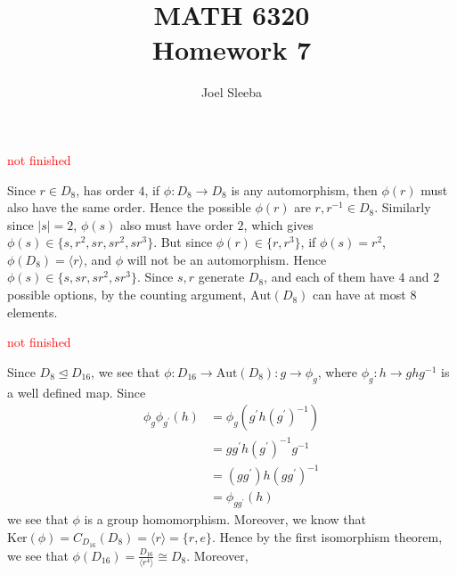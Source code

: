 \documentclass[12pt]{exam}
\theoremstyle{plain} %
\theoremstyle{definition} %
\theoremstyle{remark} %
\begin{document}
\title{MATH 6320 \\ Homework 7}

\author{
  Joel Sleeba \\
}

\maketitle
\printanswers
\unframedsolutions

\begin{questions}

  \question
  \textcolor{red}{not finished}

  \begin{solution}

  \end{solution}

  \question
  \begin{solution}
    Since $r \in D_8$, has order $4$, if $\phi: D_8 \to D_8$ is any
    automorphism, then $\phi(r)$ must also have the same order. Hence
    the possible $\phi(r)$ are $r, r^{-1} \in D_8$. Similarly  since
    $|s| = 2$, $\phi(s)$ also  must have order $2$, which gives
    $\phi(s) \in \{ s, r^2, sr, sr^2, sr^3\}$. But since $\phi(r) \in
    \{ r , r^3  \}$, if $\phi(s) = r^2$, $\phi(D_8) = \langle  r
    \rangle $, and $\phi$ will not be an automorphism. Hence $\phi(s)
    \in \{  s, sr, sr^2, sr^3 \}$. Since $s, r$ generate $D_8$, and
    each of them have $4$ and $2$ possible options, by the counting
    argument, $\textrm{Aut}(D_8)$ can have at most 8 elements.
  \end{solution}

  \question
  \textcolor{red}{not finished}
  \begin{solution}
    Since $D_8 \trianglelefteq D_{16}$, we see that $\phi: D_{16} \to
    \textrm{Aut}(D_8): g \to \phi_g$, where $\phi_g: h \to ghg^{-1}$
    is a well defined map. Since
    \begin{align*}
      \phi_g \phi_{g^\prime}(h) & = \phi_g(g^\prime h(g^\prime)^{-1}) \\
      & = gg^\prime h (g^\prime)^{-1} g^{-1} \\
      & = (gg^\prime) h (gg^\prime)^{-1} \\
      & = \phi_{gg^\prime}(h)
    \end{align*}
    we see that $\phi$ is a group homomorphism. Moreover, we know
    that $\textrm{Ker}(\phi) = C_{D_{16}}(D_8) = \langle r \rangle =
    \{r, e\}$. Hence by
    the first isomorphism theorem, we see that $\phi(D_{16}) =
    \frac{D_{16}}{\langle r^4 \rangle} \cong D_8$. Moreover,
  \end{solution}


\end{questions}
\end{document}
